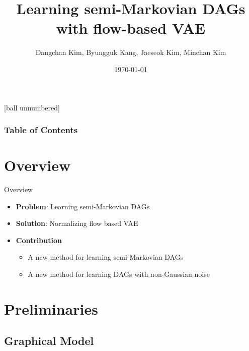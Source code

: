 \documentclass{beamer}
\title[NFG-VAE]{Learning semi-Markovian DAGs with flow-based VAE}
\author[Seoul National University]{Dangchan Kim, Byungguk Kang, Jaeseok Kim, Minchan Kim}
\institute[]{Seoul National University}
\date{\today}
\begin{document}
\frame{\titlepage}

[ball unnumbered]
\begin{frame}
    \frametitle{Table of Contents}
    \tableofcontents
\end{frame}


\section*{Overview}

\begin{frame}{Overview}
    \begin{itemize}
        \item \textbf{Problem}: Learning semi-Markovian DAGs
        \item \textbf{Solution}: Normalizing flow based VAE
        \item \textbf{Contribution}
        \begin{itemize}
            \item A new method for learning semi-Markovian DAGs
            \item A new method for learning DAGs with non-Gaussian noise
        \end{itemize}
    \end{itemize}
\end{frame}

\section{Preliminaries}

\subsection{Graphical Model}
\end{document}
